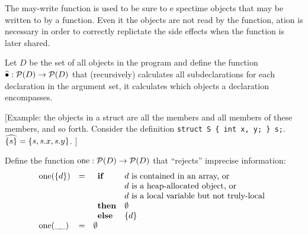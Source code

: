 \begin{docpart}
The may-write function is used to be sure to
{\memois}e spectime objects that may be written to by a function.
Even it the objects are not read by the function, {\memois}ation is
necessary in order to correctly replictate the side effects when the
function is later shared.

Let $D$ be the set of all objects in the program and define the
function $\widehat{\bullet} : \mathcal{P}(D) -> \mathcal{P}(D)$ that
(recursively) calculates all subdeclarations for each declaration in
the argument set, \ie it calculates which objects a declaration
encompasses.

[Example: the objects in a struct are all the members and all members
of these members, and so forth. Consider the definition \texttt{struct
  S \{ int x, y; \} s;}. $\widehat{\{s\}} = \{s, s.x, s.y\}$. ]



Define the function $\mbox{one} : \mathcal{P}(D) -> \mathcal{P}(D)$ that
``rejects'' imprecise information:
\[
\begin{array}{lcl}
\mbox{one}(\{d\}) &=& 
  \begin{array}[t]{ll}
    \textbf{if} & d \mbox{ is contained in an array, or} \\
                 & d \mbox{ is a heap-allocated object, or} \\
                 & d \mbox{ is a local variable but not truly-local} \\                 
    \textbf{then} & \emptyset \\
    \textbf{else} & \{ d \} \\                 
  \end{array} \\
  \mbox{one}(\_\!\_) &=& \emptyset \\
\end{array}
\]


\end{docpart}
